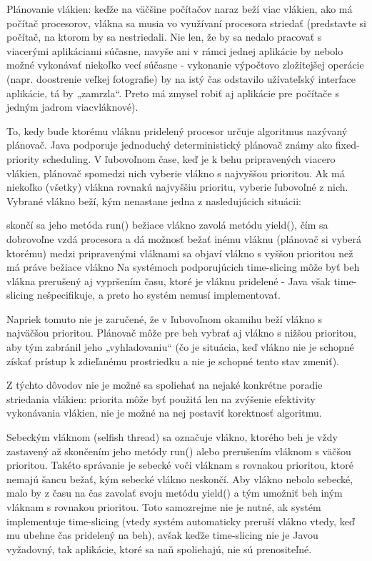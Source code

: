 Plánovanie vlákien: keďže na väčšine počítačov naraz beží viac vlákien, ako má počítač procesorov, vlákna sa musia vo využívaní procesora striedať (predstavte si počítač, na ktorom by sa nestriedali. Nie len, že by sa nedalo pracovať s viacerými aplikáciami súčasne, navyše ani v rámci jednej aplikácie by nebolo možné vykonávať niekoľko vecí súčasne - vykonanie výpočtovo zložitejšej operácie (napr. doostrenie veľkej fotografie) by na istý čas odstavilo užívateľský interface aplikácie, tá by „zamrzla“. Preto má zmysel robiť aj aplikácie pre počítače s jedným jadrom viacvláknové).

To, kedy bude ktorému vláknu pridelený procesor určuje algoritmus nazývaný plánovač. Java podporuje jednoduchý deterministický plánovač známy ako fixed-priority scheduling. V ľubovoľnom čase, keď je k behu pripravených viacero vlákien, plánovač spomedzi nich vyberie vlákno s najvyššou prioritou. Ak má niekoľko (všetky) vlákna rovnakú najvyššiu prioritu, vyberie ľubovoľné z nich. Vybrané vlákno beží, kým nenastane jedna z nasledujúcich situácii:

skončí sa jeho metóda run()
bežiace vlákno zavolá metódu yield(), čím sa dobrovoľne vzdá procesora a dá možnosť bežať inému vláknu (plánovač si vyberá ktorému)
medzi pripravenými vláknami sa objaví vlákno s vyššou prioritou než má práve bežiace vlákno
Na systémoch podporujúcich time-slicing môže byť beh vlákna prerušený aj vypršením času, ktoré je vláknu pridelené - Java však time-slicing nešpecifikuje, a preto ho systém nemusí implementovať.

Napriek tomuto nie je zaručené, že v ľubovoľnom okamihu beží vlákno s najväčšou prioritou. Plánovač môže pre beh vybrať aj vlákno s nižšou prioritou, aby tým zabránil jeho „vyhladovaniu“ (čo je situácia, keď vlákno nie je schopné získať prístup k zdieľanému prostriedku a nie je schopné tento stav zmeniť).

Z týchto dôvodov nie je možné sa spoliehať na nejaké konkrétne poradie striedania vlákien: priorita môže byť použitá len na zvýšenie efektivity vykonávania vlákien, nie je možné na nej postaviť korektnosť algoritmu.

Sebeckým vláknom (selfish thread) sa označuje vlákno, ktorého beh je vždy zastavený až skončením jeho metódy run() alebo prerušením vláknom s väčšou prioritou. Takéto správanie je sebecké voči vláknam s rovnakou prioritou, ktoré nemajú šancu bežať, kým sebecké vlákno neskončí. Aby vlákno nebolo sebecké, malo by z času na čas zavolať svoju metódu yield() a tým umožniť beh iným vláknam s rovnakou prioritou. Toto samozrejme nie je nutné, ak systém implementuje time-slicing (vtedy systém automaticky preruší vlákno vtedy, keď mu ubehne čas pridelený na beh), avšak keďže time-slicing nie je Javou vyžadovný, tak aplikácie, ktoré sa naň spoliehajú, nie sú prenositeľné.

